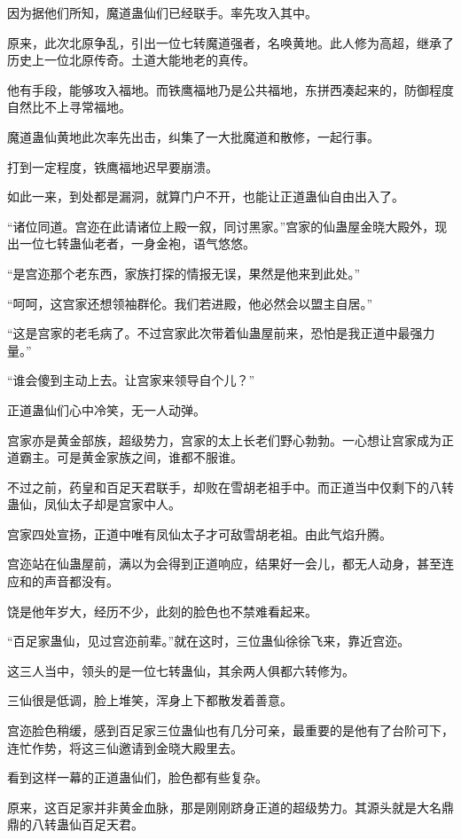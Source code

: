 \begin{this_body}
因为据他们所知，魔道蛊仙们已经联手。率先攻入其中。

原来，此次北原争乱，引出一位七转魔道强者，名唤黄地。此人修为高超，继承了历史上一位北原传奇。土道大能地老的真传。

他有手段，能够攻入福地。而铁鹰福地乃是公共福地，东拼西凑起来的，防御程度自然比不上寻常福地。

魔道蛊仙黄地此次率先出击，纠集了一大批魔道和散修，一起行事。

打到一定程度，铁鹰福地迟早要崩溃。

如此一来，到处都是漏洞，就算门户不开，也能让正道蛊仙自由出入了。

“诸位同道。宫迩在此请诸位上殿一叙，同讨黑家。”宫家的仙蛊屋金晓大殿外，现出一位七转蛊仙老者，一身金袍，语气悠悠。

“是宫迩那个老东西，家族打探的情报无误，果然是他来到此处。”

“呵呵，这宫家还想领袖群伦。我们若进殿，他必然会以盟主自居。”

“这是宫家的老毛病了。不过宫家此次带着仙蛊屋前来，恐怕是我正道中最强力量。”

“谁会傻到主动上去。让宫家来领导自个儿？”

正道蛊仙们心中冷笑，无一人动弹。

宫家亦是黄金部族，超级势力，宫家的太上长老们野心勃勃。一心想让宫家成为正道霸主。可是黄金家族之间，谁都不服谁。

不过之前，药皇和百足天君联手，却败在雪胡老祖手中。而正道当中仅剩下的八转蛊仙，凤仙太子却是宫家中人。

宫家四处宣扬，正道中唯有凤仙太子才可敌雪胡老祖。由此气焰升腾。

宫迩站在仙蛊屋前，满以为会得到正道响应，结果好一会儿，都无人动身，甚至连应和的声音都没有。

饶是他年岁大，经历不少，此刻的脸色也不禁难看起来。

“百足家蛊仙，见过宫迩前辈。”就在这时，三位蛊仙徐徐飞来，靠近宫迩。

这三人当中，领头的是一位七转蛊仙，其余两人俱都六转修为。

三仙很是低调，脸上堆笑，浑身上下都散发着善意。

宫迩脸色稍缓，感到百足家三位蛊仙也有几分可亲，最重要的是他有了台阶可下，连忙作势，将这三仙邀请到金晓大殿里去。

看到这样一幕的正道蛊仙们，脸色都有些复杂。

原来，这百足家并非黄金血脉，那是刚刚跻身正道的超级势力。其源头就是大名鼎鼎的八转蛊仙百足天君。


\end{this_body}
